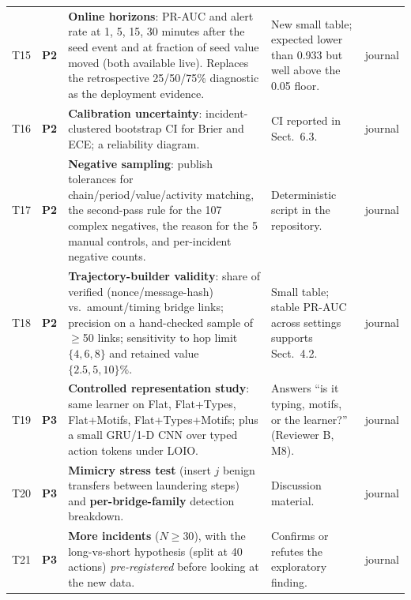 \documentclass[11pt,a4paper]{article}
\newcommand{\pTwo}{\textcolor{orange!85!black}{\textbf{P2}}}
\newcommand{\pThree}{\textcolor{blue!70!black}{\textbf{P3}}}
\begin{document}
{\begin{longtable}{@{}>{\raggedright\arraybackslash}p{0.7cm}>{\raggedright\arraybackslash}p{0.6cm}>{\raggedright\arraybackslash}p{6.9cm}>{\raggedright\arraybackslash}p{5.6cm}>{\raggedright\arraybackslash}p{1.25cm}@{}}
T15 & \pTwo & \textbf{Online horizons}: PR-AUC and alert rate at 1, 5, 15, 30 minutes after the seed event and at fraction of seed value moved (both available live). Replaces the retrospective 25/50/75\% diagnostic as the deployment evidence. & New small table; expected lower than 0.933 but well above the 0.05 floor. & journal \\
T16 & \pTwo & \textbf{Calibration uncertainty}: incident-clustered bootstrap CI for Brier and ECE; a reliability diagram. & CI reported in Sect.~6.3. & journal \\
T17 & \pTwo & \textbf{Negative sampling}: publish tolerances for chain/period/value/activity matching, the second-pass rule for the 107 complex negatives, the reason for the 5 manual controls, and per-incident negative counts. & Deterministic script in the repository. & journal \\
T18 & \pTwo & \textbf{Trajectory-builder validity}: share of verified (nonce/message-hash) vs.\ amount/timing bridge links; precision on a hand-checked sample of $\ge$50 links; sensitivity to hop limit $\{4,6,8\}$ and retained value $\{2.5,5,10\}\%$. & Small table; stable PR-AUC across settings supports Sect.~4.2. & journal \\
T19 & \pThree & \textbf{Controlled representation study}: same learner on Flat, Flat+Types, Flat+Motifs, Flat+Types+Motifs; plus a small GRU/1-D CNN over typed action tokens under LOIO. & Answers ``is it typing, motifs, or the learner?'' (Reviewer B, M8). & journal \\
T20 & \pThree & \textbf{Mimicry stress test} (insert $j$ benign transfers between laundering steps) and \textbf{per-bridge-family} detection breakdown. & Discussion material. & journal \\
T21 & \pThree & \textbf{More incidents} ($N\ge30$), with the long-vs-short hypothesis (split at 40 actions) \emph{pre-registered} before looking at the new data. & Confirms or refutes the exploratory finding. & journal \\
\bottomrule
\end{longtable}
}
\end{document}
